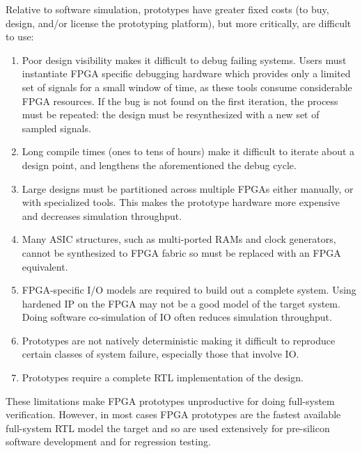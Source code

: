 Relative to software simulation, prototypes have greater fixed costs (to buy, design, and/or license the 
prototyping platform), but more critically, are difficult to use:
\begin{enumerate}
    \item Poor design visibility makes it difficult to debug failing systems. Users must instantiate
        FPGA specific debugging hardware which provides only a limited set of
        signals for a small window of time, as these tools consume considerable
        FPGA resources.  If the bug is not found on the first iteration, the
        process must be repeated: the design must be resynthesized with a new
        set of sampled signals.

    \item Long compile times (ones to tens of hours) make it difficult to
        iterate about a design point, and lengthens the aforementioned the debug cycle.

    \item Large designs must be partitioned across multiple FPGAs either
        manually, or with specialized tools. This makes the prototype hardware
        more expensive and decreases simulation throughput.

    \item Many ASIC structures, such as multi-ported RAMs and clock generators,
        cannot be synthesized to FPGA fabric so must be replaced with an FPGA
        equivalent.

    \item FPGA-specific I/O models are required to build out a complete system. Using hardened
        IP on the FPGA may not be a good model of the target system. Doing software co-simulation of IO
        often reduces simulation throughput.

    \item Prototypes are not natively deterministic making it difficult to
        reproduce certain classes of system failure, especially those that
        involve IO.

    \item Prototypes require a complete RTL implementation of the design.
\end{enumerate}

These limitations make FPGA prototypes unproductive for doing full-system
verification. However, in most cases FPGA prototypes are the fastest available
full-system RTL model the target and so are used extensively for
pre-silicon software development and for regression testing.

